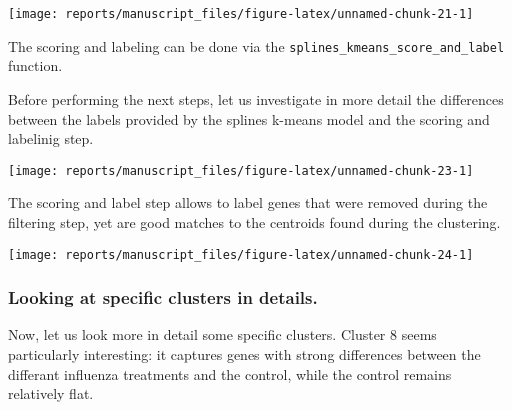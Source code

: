 \documentclass[9pt,a4paper,]{extarticle}
\newenvironment{Shaded}{\begin{snugshade}}{\end{snugshade}}
\newcommand{\CommentTok}[1]{\textcolor[rgb]{0.56,0.35,0.01}{\textit{#1}}}
\newcommand{\KeywordTok}[1]{\textcolor[rgb]{0.13,0.29,0.53}{\textbf{#1}}}
\newcommand{\NormalTok}[1]{#1}
\newcommand{\OperatorTok}[1]{\textcolor[rgb]{0.81,0.36,0.00}{\textbf{#1}}}
\newcommand{\StringTok}[1]{\textcolor[rgb]{0.31,0.60,0.02}{#1}}
\begin{document}
\begin{center}\texttt{[image: reports/manuscript\_files/figure-latex/unnamed-chunk-21-1]} \end{center}

The scoring and labeling can be done via the \texttt{splines\_kmeans\_score\_and\_label}
function.

\begin{Shaded}
\end{Shaded}

Before performing the next steps, let us investigate in more detail the
differences between the labels provided by the splines k-means model and the
scoring and labelinig step.

\begin{center}\texttt{[image: reports/manuscript\_files/figure-latex/unnamed-chunk-23-1]} \end{center}

The scoring and label step allows to label genes that were removed during the
filtering step, yet are good matches to the centroids found during the
clustering.

\begin{center}\texttt{[image: reports/manuscript\_files/figure-latex/unnamed-chunk-24-1]} \end{center}

\hypertarget{looking-at-specific-clusters-in-details.}{%
\subsubsection{Looking at specific clusters in details.}\label{looking-at-specific-clusters-in-details.}}

Now, let us look more in detail some specific clusters. Cluster 8 seems
particularly interesting: it captures genes with strong differences between
the differant influenza treatments and the control, while the control remains
relatively flat.
\end{document}
